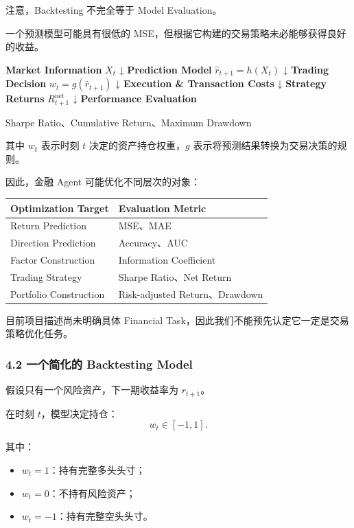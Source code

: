注意，Backtesting 不完全等于 Model Evaluation。

一个预测模型可能具有很低的 MSE，但根据它构建的交易策略未必能够获得良好的收益。

\textbf{Market Information} \(X_t\) ↓ \textbf{Prediction Model} \(\hat r_{t+1}=h(X_t)\) ↓ \textbf{Trading Decision} \(w_t=g(\hat r_{t+1})\) ↓ \textbf{Execution \& Transaction Costs} ↓ \textbf{Strategy Returns} \(R_{t+1}^{\mathrm{net}}\) ↓ \textbf{Performance Evaluation}

Sharpe Ratio、Cumulative Return、Maximum Drawdown

其中 \(w_t\) 表示时刻 \(t\) 决定的资产持仓权重，\(g\) 表示将预测结果转换为交易决策的规则。

因此，金融 Agent 可能优化不同层次的对象：

\begin{readertable}
\begin{longtable}[]{@{}
  >{\raggedright\arraybackslash}p{}
  >{\raggedright\arraybackslash}p{}@{}}
\toprule
Optimization Target & Evaluation Metric \\
\midrule
\endhead
Return Prediction & MSE、MAE \\
Direction Prediction & Accuracy、AUC \\
Factor Construction & Information Coefficient \\
Trading Strategy & Sharpe Ratio、Net Return \\
Portfolio Construction & Risk-adjusted Return、Drawdown \\
\bottomrule
\end{longtable}
\end{readertable}

目前项目描述尚未明确具体 Financial Task，因此我们不能预先认定它一定是交易策略优化任务。

\hypertarget{part-2-27-0001-ux4e00ux4e2aux7b80ux5316ux7684-backtesting-model}{%
\subsubsection{4.2 一个简化的 Backtesting Model}\label{part-2-27-0001-ux4e00ux4e2aux7b80ux5316ux7684-backtesting-model}}

假设只有一个风险资产，下一期收益率为 \(r_{t+1}\)。

在时刻 \(t\)，模型决定持仓：
\[w_t\in[-1,1].\]

其中：

\begin{itemize}
\tightlist
\item
  \(w_t=1\)：持有完整多头头寸；
\item
  \(w_t=0\)：不持有风险资产；
\item
  \(w_t=-1\)：持有完整空头头寸。
\end{itemize}


